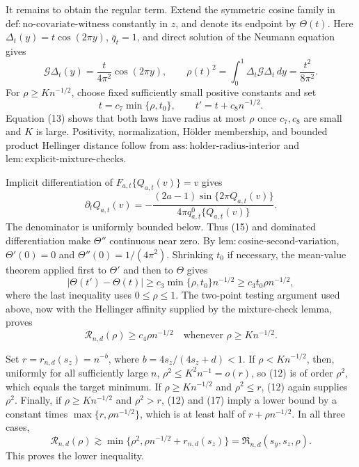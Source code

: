 It remains to obtain the regular term.  Extend the symmetric cosine family in
\(\mathrm{def{:}no\text{-}covariate\text{-}witness}\) constantly in \(z\), and denote its endpoint by \(\Theta(t)\).  Here
\(\Delta_t(y)=t\cos(2\pi y)\), \(\bar q_t=1\), and direct solution of the Neumann equation gives
\[
\mathcal G\Delta_t(y)=\frac{t}{4\pi^2}\cos(2\pi y),
\qquad
\rho(t)^2=\int_0^1\Delta_t\mathcal G\Delta_t\,dy
=\frac{t^2}{8\pi^2}.                                        \tag{13}
\]
For \(\rho\ge K n^{-1/2}\), choose fixed sufficiently small positive constants and set
\[
t=c_7\min\{\rho,t_0\},
\qquad t'=t+c_8n^{-1/2}.                                    \tag{14}
\]
Equation (13) shows that both laws have radius at most \(\rho\) once \(c_7,c_8\) are small and \(K\) is large.  Positivity, normalization, H\"older membership, and bounded product Hellinger distance follow from
\(\mathrm{ass{:}holder\text{-}radius\text{-}interior}\) and
\(\mathrm{lem{:}explicit\text{-}mixture\text{-}checks}\).

Implicit differentiation of
\(F_{a,t}\{Q_{a,t}(v)\}=v\) gives
\[
\partial_tQ_{a,t}(v)
=-\frac{(2a-1)\sin\{2\pi Q_{a,t}(v)\}}
{4\pi q_{a,t}^{0}\{Q_{a,t}(v)\}}.                         \tag{15}
\]
The denominator is uniformly bounded below.  Thus (15) and dominated differentiation make \(\Theta''\) continuous near zero.  By
\(\mathrm{lem{:}cosine\text{-}second\text{-}variation}\),
\(\Theta'(0)=0\) and \(\Theta''(0)=1/(4\pi^2)\).  Shrinking \(t_0\) if necessary, the mean-value theorem applied first to \(\Theta'\) and then to \(\Theta\) gives
\[
|\Theta(t')-\Theta(t)|
\ge c_3\min\{\rho,t_0\}n^{-1/2}
\ge c_3t_0\rho n^{-1/2},                                  \tag{16}
\]
where the last inequality uses \(0\le\rho\le1\).  The two-point testing argument used above, now with the Hellinger affinity supplied by the mixture-check lemma, proves
\[
\mathcal R_{n,d}(\rho)\ge c_4\rho n^{-1/2}
\quad\text{whenever }\rho\ge K n^{-1/2}.                   \tag{17}
\]

Set \(r=r_{n,d}(s_z)=n^{-b}\), where
\(b=4s_z/(4s_z+d)<1\).  If \(\rho<K n^{-1/2}\), then, uniformly for all sufficiently large \(n\),
\(\rho^2\le K^2n^{-1}=o(r)\), so (12) is of order \(\rho^2\), which equals the target minimum.  If \(\rho\ge K n^{-1/2}\) and \(\rho^2\le r\), (12) again supplies \(\rho^2\).  Finally, if \(\rho\ge K n^{-1/2}\) and \(\rho^2>r\), (12) and (17) imply a lower bound by a constant times
\(\max\{r,\rho n^{-1/2}\}\), which is at least half of
\(r+\rho n^{-1/2}\).  In all three cases,
\[
\mathcal R_{n,d}(\rho)
\gtrsim
\min\{\rho^2,\rho n^{-1/2}+r_{n,d}(s_z)\}
=\mathfrak R_{n,d}(s_y,s_z,\rho).                           \tag{18}
\]
This proves the lower inequality.

